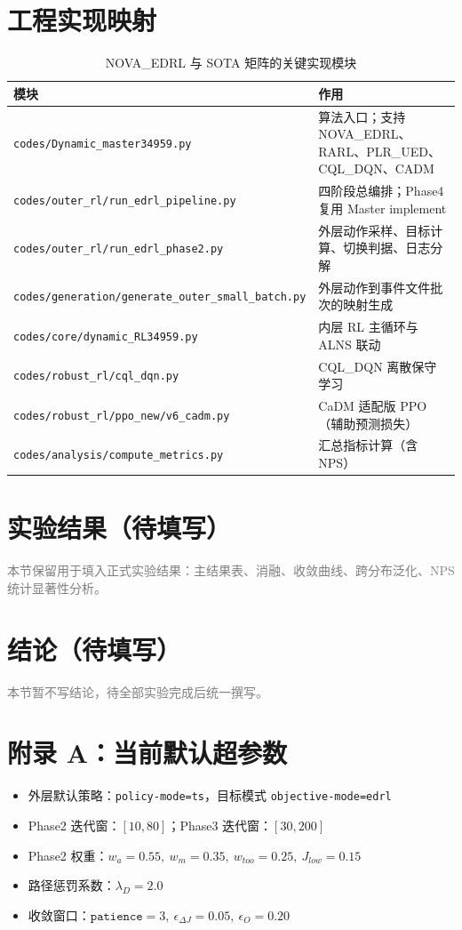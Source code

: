 \documentclass[UTF8,11pt,a4paper]{ctexart}
\begin{document}
\section{工程实现映射}
\begin{table}[H]
\centering
\caption{NOVA\_EDRL 与 SOTA 矩阵的关键实现模块}
\begin{tabular}{p{4.9cm}p{9.5cm}}
\toprule
模块 & 作用 \\
\midrule
\texttt{codes/Dynamic\_master34959.py} & 算法入口；支持 NOVA\_EDRL、RARL、PLR\_UED、CQL\_DQN、CADM \\
\texttt{codes/outer\_rl/run\_edrl\_pipeline.py} & 四阶段总编排；Phase4 复用 Master implement \\
\texttt{codes/outer\_rl/run\_edrl\_phase2.py} & 外层动作采样、目标计算、切换判据、日志分解 \\
\texttt{codes/generation/generate\_outer\_small\_batch.py} & 外层动作到事件文件批次的映射生成 \\
\texttt{codes/core/dynamic\_RL34959.py} & 内层 RL 主循环与 ALNS 联动 \\
\texttt{codes/robust\_rl/cql\_dqn.py} & CQL\_DQN 离散保守学习 \\
\texttt{codes/robust\_rl/ppo\_new/v6\_cadm.py} & CaDM 适配版 PPO（辅助预测损失） \\
\texttt{codes/analysis/compute\_metrics.py} & 汇总指标计算（含 NPS） \\
\bottomrule
\end{tabular}
\end{table}

\section{实验结果（待填写）}
\textcolor{gray}{本节保留用于填入正式实验结果：主结果表、消融、收敛曲线、跨分布泛化、NPS 统计显著性分析。}

\section{结论（待填写）}
\textcolor{gray}{本节暂不写结论，待全部实验完成后统一撰写。}

\section*{附录 A：当前默认超参数}
\begin{itemize}
\item 外层默认策略：\texttt{policy-mode=ts}，目标模式 \texttt{objective-mode=edrl}
\item Phase2 迭代窗：\([10,80]\)；Phase3 迭代窗：\([30,200]\)
\item Phase2 权重：\(w_a=0.55,\ w_m=0.35,\ w_{too}=0.25,\ J_{low}=0.15\)
\item 路径惩罚系数：\(\lambda_D=2.0\)
\item 收敛窗口：\(\texttt{patience}=3,\ \epsilon_{\Delta J}=0.05,\ \epsilon_O=0.20\)
\end{itemize}
\end{document}
